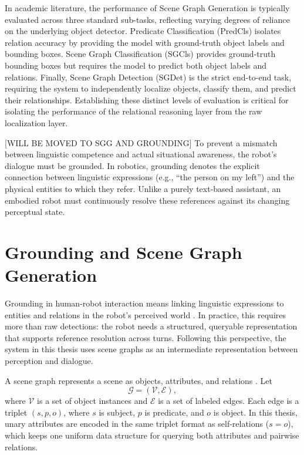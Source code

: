 In academic literature, the performance of Scene Graph Generation is typically evaluated across three standard sub-tasks, reflecting varying degrees of reliance on the underlying object detector. Predicate Classification (PredCls) isolates relation accuracy by providing the model with ground-truth object labels and bounding boxes. Scene Graph Classification (SGCls) provides ground-truth bounding boxes but requires the model to predict both object labels and relations. Finally, Scene Graph Detection (SGDet) is the strict end-to-end task, requiring the system to independently localize objects, classify them, and predict their relationships. Establishing these distinct levels of evaluation is critical for isolating the performance of the relational reasoning layer from the raw localization layer.


[WILL BE MOVED TO SGG AND GROUNDING]
To prevent a mismatch between linguistic competence and actual situational awareness, the robot's dialogue must be grounded. In robotics, grounding denotes the explicit connection between linguistic expressions (e.g., \enquote{the person on my left}) and the physical entities to which they refer. Unlike a purely text-based assistant, an embodied robot must continuously resolve these references against its changing perceptual state.



\section{Grounding and Scene Graph Generation}

Grounding in human-robot interaction means linking linguistic expressions to entities and relations in the robot's perceived world \cite{lemaignan_grounding_2012}. In practice, this requires more than
raw detections: the robot needs a structured, queryable representation that supports reference resolution across turns. Following this perspective, the system in this thesis uses scene graphs as an
intermediate representation between perception and dialogue.

A scene graph represents a scene as objects, attributes, and relations \cite{johnson_image_2015}. Let
\[
\mathcal{G}=(\mathcal{V},\mathcal{E}),
\]
where \(\mathcal{V}\) is a set of object instances and \(\mathcal{E}\) is a set of labeled edges. Each edge is a triplet \((s,p,o)\), where \(s\) is subject, \(p\) is predicate, and \(o\) is object. In
this thesis, unary attributes are encoded in the same triplet format as self-relations (\(s=o\)), which keeps one uniform data structure for querying both attributes and pairwise relations.

